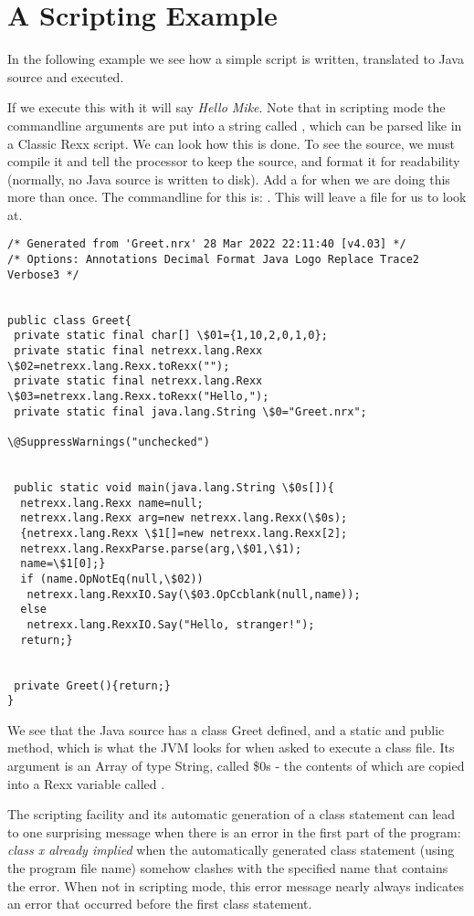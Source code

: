 \section{A Scripting Example}
In the following example we see how a simple script is written,
translated to Java source and executed.

If we execute this with  it will say \emph{Hello Mike}. Note that in scripting mode the commandline arguments are put into a string called , which can be parsed like in a Classic Rexx script. We can look how this is done. To see the source, we must compile it and tell the processor to keep the source, and format it for readability (normally, no Java source is written to disk). Add a  for when we are doing this more than once.
The commandline for this is: . This will leave a  file for us to look at.
\begin{lstlisting}
/* Generated from 'Greet.nrx' 28 Mar 2022 22:11:40 [v4.03] */
/* Options: Annotations Decimal Format Java Logo Replace Trace2 Verbose3 */


public class Greet{
 private static final char[] \$01={1,10,2,0,1,0};
 private static final netrexx.lang.Rexx \$02=netrexx.lang.Rexx.toRexx("");
 private static final netrexx.lang.Rexx \$03=netrexx.lang.Rexx.toRexx("Hello,");
 private static final java.lang.String \$0="Greet.nrx";

\@SuppressWarnings("unchecked")


 public static void main(java.lang.String \$0s[]){
  netrexx.lang.Rexx name=null;
  netrexx.lang.Rexx arg=new netrexx.lang.Rexx(\$0s);
  {netrexx.lang.Rexx \$1[]=new netrexx.lang.Rexx[2];
  netrexx.lang.RexxParse.parse(arg,\$01,\$1);
  name=\$1[0];}
  if (name.OpNotEq(null,\$02))
   netrexx.lang.RexxIO.Say(\$03.OpCcblank(null,name));
  else
   netrexx.lang.RexxIO.Say("Hello, stranger!");
  return;}


 private Greet(){return;}
}
\end{lstlisting}
We see that the Java source has a class Greet defined, and a static and public  method, which is what the JVM looks for when asked to execute a class file. Its argument is an Array of type String, called \$0s - the contents of which are copied into a Rexx variable called .

\begin{shaded}
The scripting facility and its automatic generation of a class
statement can lead to one surprising message when there is
an error in the first part of the program: \emph{class x already
  implied} when the automatically generated class statement (using the
program file name) somehow clashes with the specified name that
contains the error. When not in scripting mode, this error message
nearly always indicates an error that occurred before the first class statement.
\end{shaded}

